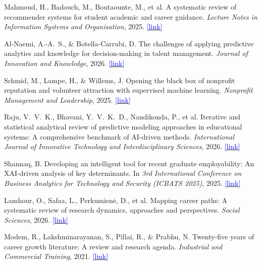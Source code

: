 \documentclass[10pt,twocolumn]{article}
\newcommand{\surl}[1]{\href{#1}{\textcolor{blue}{\small[link]}}}
\begin{document}
\begin{thebibliography}{25}
Mahmoud, H., Badouch, M., Boutaounte, M., et al.
\newblock A systematic review of recommender systems for student academic and
career guidance.
\newblock \emph{Lecture Notes in Information Systems and Organisation}, 2025.
\newblock \surl{https://www.scopus.com/pages/publications/105027186185}

Al-Naemi, A.-A.\ S., \& Botella-Carrubi, D.
\newblock The challenges of applying predictive analytics and knowledge for
decision-making in talent management.
\newblock \emph{Journal of Innovation and Knowledge}, 2026.
\newblock \surl{https://www.scopus.com/pages/publications/105036435793}

Schmid, M., Lampe, H., \& Willems, J.
\newblock Opening the black box of nonprofit reputation and volunteer attraction
with supervised machine learning.
\newblock \emph{Nonprofit Management and Leadership}, 2025.
\newblock \surl{https://www.scopus.com/pages/publications/105025665450}

Raju, V.\ V.\ K., Bhavani, Y.\ V.\ K.\ D., Nandikonda, P., et al.
\newblock Iterative and statistical analytical review of predictive modeling
approaches in educational systems: A comprehensive benchmark of AI-driven
methods.
\newblock \emph{International Journal of Innovative Technology and
Interdisciplinary Sciences}, 2026.
\newblock \surl{https://www.scopus.com/pages/publications/105033720352}

Shannaq, B.
\newblock Developing an intelligent tool for recent graduate employability:
An XAI-driven analysis of key determinants.
\newblock In \emph{3rd International Conference on Business Analytics for
Technology and Security (ICBATS 2025)}, 2025.
\newblock \surl{https://www.scopus.com/pages/publications/105030543211}

Lamhour, O., Safaa, L., Perkumienė, D., et al.
\newblock Mapping career paths: A systematic review of research dynamics,
approaches and perspectives.
\newblock \emph{Social Sciences}, 2026.
\newblock \surl{https://www.scopus.com/pages/publications/105031365540}

Modem, R., Lakshminarayanan, S., Pillai, R., \& Prabhu, N.
\newblock Twenty-five years of career growth literature: A review and research
agenda.
\newblock \emph{Industrial and Commercial Training}, 2021.
\newblock \surl{https://www.scopus.com/pages/publications/85120790426}


\end{thebibliography}
\end{document}
